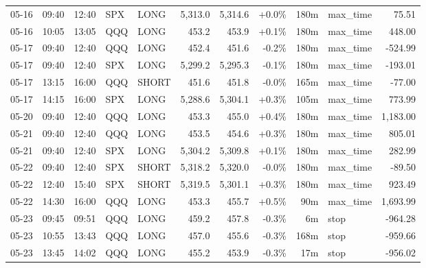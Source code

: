 \documentclass[11pt,a4paper,twoside]{article}
\begin{document}
\begin{center}
\begin{longtable}{>{\color{txtmain}}l l l l l r r r r >{\color{txtmain}}l r}
05-16 & 09:40 & 12:40 & SPX & LONG & 5,313.0 & 5,314.6 & \textcolor{wingreen}{+0.0\%} & 180m & max\_time & \textcolor{wingreen}{75.51} \\
05-16 & 10:05 & 13:05 & QQQ & LONG & 453.2 & 453.9 & \textcolor{wingreen}{+0.1\%} & 180m & max\_time & \textcolor{wingreen}{448.00} \\
05-17 & 09:40 & 12:40 & QQQ & LONG & 452.4 & 451.6 & \textcolor{lossred}{-0.2\%} & 180m & max\_time & \textcolor{lossred}{-524.99} \\
05-17 & 09:40 & 12:40 & SPX & LONG & 5,299.2 & 5,295.3 & \textcolor{lossred}{-0.1\%} & 180m & max\_time & \textcolor{lossred}{-193.01} \\
05-17 & 13:15 & 16:00 & QQQ & SHORT & 451.6 & 451.8 & \textcolor{lossred}{-0.0\%} & 165m & max\_time & \textcolor{lossred}{-77.00} \\
05-17 & 14:15 & 16:00 & SPX & LONG & 5,288.6 & 5,304.1 & \textcolor{wingreen}{+0.3\%} & 105m & max\_time & \textcolor{wingreen}{773.99} \\
05-20 & 09:40 & 12:40 & QQQ & LONG & 453.3 & 455.0 & \textcolor{wingreen}{+0.4\%} & 180m & max\_time & \textcolor{wingreen}{1,183.00} \\
05-21 & 09:40 & 12:40 & QQQ & LONG & 453.5 & 454.6 & \textcolor{wingreen}{+0.3\%} & 180m & max\_time & \textcolor{wingreen}{805.01} \\
05-21 & 09:40 & 12:40 & SPX & LONG & 5,304.2 & 5,309.8 & \textcolor{wingreen}{+0.1\%} & 180m & max\_time & \textcolor{wingreen}{282.99} \\
05-22 & 09:40 & 12:40 & SPX & SHORT & 5,318.2 & 5,320.0 & \textcolor{lossred}{-0.0\%} & 180m & max\_time & \textcolor{lossred}{-89.50} \\
05-22 & 12:40 & 15:40 & SPX & SHORT & 5,319.5 & 5,301.1 & \textcolor{wingreen}{+0.3\%} & 180m & max\_time & \textcolor{wingreen}{923.49} \\
05-22 & 14:30 & 16:00 & QQQ & LONG & 453.3 & 455.7 & \textcolor{wingreen}{+0.5\%} & 90m & max\_time & \textcolor{wingreen}{1,693.99} \\
05-23 & 09:45 & 09:51 & QQQ & LONG & 459.2 & 457.8 & \textcolor{lossred}{-0.3\%} & 6m & stop & \textcolor{lossred}{-964.28} \\
05-23 & 10:55 & 13:43 & QQQ & LONG & 457.0 & 455.6 & \textcolor{lossred}{-0.3\%} & 168m & stop & \textcolor{lossred}{-959.66} \\
05-23 & 13:45 & 14:02 & QQQ & LONG & 455.2 & 453.9 & \textcolor{lossred}{-0.3\%} & 17m & stop & \textcolor{lossred}{-956.02} \\

\end{longtable}
\end{center}
\end{document}
